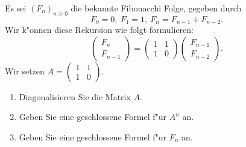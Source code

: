 \documentclass[a4,11pt]{article}
\begin{document}
\begin{aufgabe}[4 Punkte]
Es sei $(F_n)_{n\geq 0}$ die bekannte Fibonacchi Folge, gegeben durch
\[
F_0 = 0, \ F_1 = 1, \  F_{n} = F_{n-1} + F_{n-2}.
\]
Wir k"onnen diese Rekursion wie folgt formulieren:
\[
\begin{pmatrix}F_{n} \\ F_{n-1}\end{pmatrix} =
\begin{pmatrix} 1 & 1\\ 1 & 0\end{pmatrix}
\begin{pmatrix}F_{n-1} \\ F_{n-2}\end{pmatrix}.
\]
Wir setzen $A = \begin{pmatrix} 1 & 1\\ 1 & 0\end{pmatrix}$.
  
\begin{enumerate}
\item Diagonalisieren Sie die Matrix $A$.
\item Geben Sie eine geschlossene Formel f"ur $A^n$ an.
\item Geben Sie eine geschlossene Formel f"ur $F_n$ an.
\end{enumerate}

\end{aufgabe}
\end{document}
